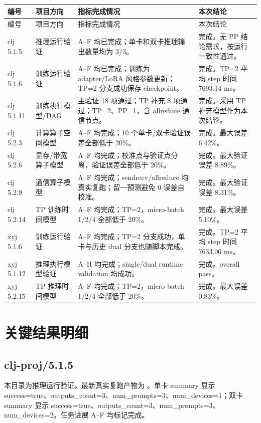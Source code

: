 \documentclass[UTF8,a4paper,11pt]{ctexart}
\begin{document}
\begin{longtable}{L{1.8cm} L{3.0cm} L{5.1cm} L{5.1cm}}
\toprule
编号 & 项目方向 & 指标完成情况 & 本次结论 \\
\midrule
\endfirsthead
\toprule
编号 & 项目方向 & 指标完成情况 & 本次结论 \\
\midrule
\endhead
clj 5.1.5 & 推理运行验证 & A--F 均已完成；单卡和双卡推理输出数量均为 3/3。 & 完成。无 PP 结论需求，按运行一致性通过。 \\
clj 5.1.6 & 训练运行验证 & A--F 均已完成；训练为 adapter/LoRA 风格参数更新；TP=2 分支成功保存 checkpoint。 & 完成。TP=2 平均 step 时间 7693.14 ms。 \\
clj 5.1.11 & 训练执行模型/DAG & 主验证 18 项通过；TP 补充 8 项通过；TP=2、PP=1，含 allreduce 通信节点。 & 完成。采用 TP 补充模型作为本次结论。 \\
clj 5.2.3 & 计算算子空间模型 & A--F 均完成；10 个单卡/双卡验证误差全部低于 20\%。 & 完成。最大误差 6.42\%。 \\
clj 5.2.6 & 显存/带宽算子模型 & A--F 均完成；校准点与验证点分离，验证误差全部低于 20\%。 & 完成。最大验证误差 8.89\%。 \\
clj 5.2.9 & 通信算子模型 & A--F 均完成；sendrecv/allreduce 均真实复跑；留一预测避免 0 误差自校准。 & 完成。最大验证误差 8.31\%。 \\
clj 5.2.14 & TP 训练时间模型 & A--F 均完成；TP=2，micro-batch 1/2/4 全部低于 20\%。 & 完成。最大误差 5.10\%。 \\
xyj 5.1.6 & 训练运行验证 & A--F 均完成；TP=2 分支成功，单卡与历史 dual 分支也随脚本完成。 & 完成。TP=2 平均 step 时间 7633.06 ms。 \\
xyj 5.1.12 & 推理执行模型验证 & A--H 均完成；single/dual runtime validation 均成功。 & 完成。overall pass。 \\
xyj 5.2.15 & TP 推理时间模型 & A--F 均完成；TP=2，micro-batch 1/2/4 全部低于 20\%。 & 完成。最大误差 0.83\%。 \\
\bottomrule
\end{longtable}

\section{关键结果明细}

\subsection{clj-proj/5.1.5}

本目录为推理运行验证。最新真实复跑产物为 。单卡 summary 显示 success=true、outputs\_count=3、num\_prompts=3、num\_devices=1；双卡 summary 显示 success=true、outputs\_count=3、num\_prompts=3、num\_devices=2。任务进展 A--F 均标记完成。
\end{document}
